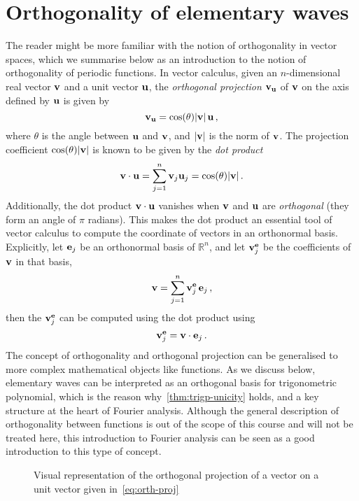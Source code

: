\section{Orthogonality of elementary waves}
The reader might be more familiar with the notion of orthogonality in vector spaces, which
we summarise below as an introduction to the notion of orthogonality of periodic
functions. In vector calculus, given an $n$-dimensional real vector $\mathbf{v}$ and a unit
vector $\mathbf{u}$, the \emph{orthogonal projection} $\mathbf{v}_{\mathbf{u}}$ of $\mathbf{v}$ on the axis
defined by $\mathbf{u}$ is given by
\begin{equation}
  \label{eq:orth-proj}
  \mathbf{v}_{\mathbf{u}}=\cos(\theta)|\mathbf{v}|\,\mathbf{u}\,,
\end{equation}
where $\theta$ is the angle between $\mathbf{u}$ and $\mathbf{v}$, and $|\mathbf{v}|$ is the norm of
$\mathbf{v}$. The projection coefficient $\cos(\theta)|\mathbf{v}|$ is known to be given by the
\emph{dot product}
\begin{equation}
  \mathbf{v}\cdot \mathbf{u}=\sum_{j=1}^n \mathbf{v}_j \mathbf{u}_j=\cos(\theta)|\mathbf{v}|\,.
  \label{eq:vec-dot}
\end{equation}
Additionally, the dot product $\mathbf{v}\cdot \mathbf{u}$ vanishes when $\mathbf{v}$ and $\mathbf{u}$ are
\emph{orthogonal} (\ie they form an angle of $\pi$ radians). This makes the dot product an
essential tool of vector calculus to compute the coordinate of vectors in an orthonormal
basis. Explicitly, let $\mathbf{e}_j$ be an orthonormal basis of $\mathbb{R}^n$, and let
$\mathbf{v}^{\mathbf{e}}_j$ be the coefficients of $\mathbf{v}$ in that basis, \ie
\begin{equation}
  \mathbf{v}=\sum_{j=1}^{n}\mathbf{v}^{\mathbf{e}}_j\,\mathbf{e}_j\,,
\end{equation}
then the $\mathbf{v}^{\mathbf{e}}_j$ can be computed using the dot product using
\begin{equation}
  \mathbf{v}^{\mathbf{e}}_j=\mathbf{v}\cdot \mathbf{e}_j\,.\label{eq:basis-proj}
\end{equation}
The concept of orthogonality and orthogonal projection can be generalised to more complex
mathematical objects like functions. As we discuss below, elementary waves can be
interpreted as an orthogonal basis for trigonometric polynomial, which is the reason
why~\cref{thm:trigp-unicity} holds, and a key structure at the heart of Fourier analysis.
Although the general description of orthogonality between functions is out of the scope of
this course and will not be treated here, this introduction to Fourier analysis can be
seen as a good introduction to this type of concept.
\begin{figure}[t]
  \caption{Visual representation of the orthogonal projection of a vector on a unit vector
  given in~\cref{eq:orth-proj}}
  \label{fig:orth-proj}
\end{figure}

